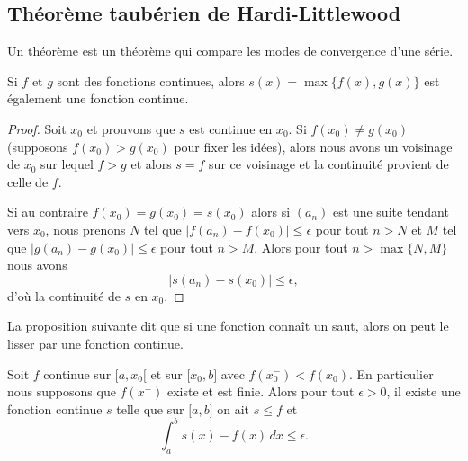 \subsection{Théorème taubérien de Hardi-Littlewood}

Un théorème  est un théorème qui compare les modes de convergence d'une série.

\begin{lemma}
    Si \( f\) et \( g\) sont des fonctions continues, alors \( s(x)=\max\{ f(x),g(x) \}\) est également une fonction continue.
\end{lemma}

\begin{proof}
    Soit \( x_0\) et prouvons que \( s\) est continue en \( x_0\). Si \( f(x_0)\neq g(x_0)\) (supposons \( f(x_0)>g(x_0)\) pour fixer les idées), alors nous avons un voisinage de \( x_0\) sur lequel \( f>g\) et alors \( s=f\) sur ce voisinage et la continuité provient de celle de \( f\).

    Si au contraire \( f(x_0)=g(x_0)=s(x_0)\) alors si \( (a_n)\) est une suite tendant vers \( x_0\), nous prenons \( N\) tel que \( \big| f(a_n)-f(x_0) \big|\leq \epsilon\) pour tout \( n>N\) et \( M\) tel que \( \big| g(a_n)-g(x_0) \big|\leq \epsilon\) pour tout \( n> M\). Alors pour tout \( n>\max\{ N,M \}\) nous avons
    \begin{equation}
        \big| s(a_n)-s(x_0) \big|\leq \epsilon,
    \end{equation}
    d'où la continuité de \( s\) en \( x_0\).
\end{proof}

La proposition suivante dit que si une fonction connaît un saut, alors on peut le lisser par une fonction continue.
\begin{proposition} \label{PropTIeYVw}
    Soit \( f\) continue sur \( \mathopen[ a , x_0 [\) et sur \( \mathopen[ x_0 , b \mathclose]\) avec \( f(x_0^-)<f(x_0)\). En particulier nous supposons que \( f(x^-)\) existe et est finie. Alors pour tout \( \epsilon>0\), il existe une fonction continue \( s\) telle que sur \( \mathopen[ a , b \mathclose]\) on ait \( s\leq f\) et
    \begin{equation}
        \int_a^bs(x)-f(x)\,dx\leq \epsilon.
    \end{equation}
\end{proposition}

